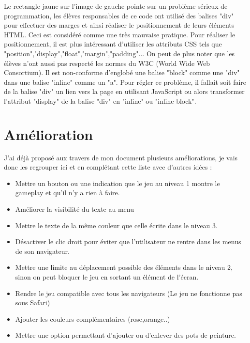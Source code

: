 \documentclass{article}
\begin{document}
Le rectangle jaune sur l'image de gauche pointe sur un problème sérieux de programmation, les élèves responsables de ce code ont utilisé des balises "div" pour effectuer des marges et ainsi réaliser le positionnement de leurs éléments HTML. Ceci est considéré comme une très mauvaise pratique. Pour réaliser le positionnement, il est plus intéressant d'utiliser les attributs CSS tels que "position","display","float","margin","padding"... On peut de plus noter que les élèves n'ont aussi pas respecté les normes du W3C (World Wide Web Consortium). Il est non-conforme d'englobé une balise "block" comme une "div" dans une balise "inline" comme un "a". Pour régler ce problème, il fallait soit faire de la balise "div" un lien vers la page en utilisant JavaScript ou alors transformer l'attribut "display" de la balise "div" en "inline" ou "inline-block".\\

\newpage
\section{Amélioration}

\hspace*{0.6cm}J'ai déjà proposé aux travers de mon document plusieurs améliorations, je vais donc les regrouper ici et en complétant cette liste avec d'autres idées :\\
\begin{itemize}
  \item Mettre un bouton ou une indication que le jeu au niveau 1 montre le gameplay et qu'il n'y a rien à faire.
  \item Améliorer la visibilité du texte au menu
  \item Mettre le texte de la même couleur que celle écrite dans le niveau 3.
  \item Désactiver le clic droit pour éviter que l'utilisateur ne rentre dans les menus de son navigateur.
  \item Mettre une limite au déplacement possible des éléments dans le niveau 2, sinon on peut bloquer le jeu en sortant un élément de l'écran.
  \item Rendre le jeu compatible avec tous les navigateurs (Le jeu ne fonctionne pas sous Safari)
  \item Ajouter les couleurs complémentaires (rose,orange..)
  \item Mettre une option permettant d'ajouter ou d'enlever des pots de peinture.
\end{itemize}
\end{document}
